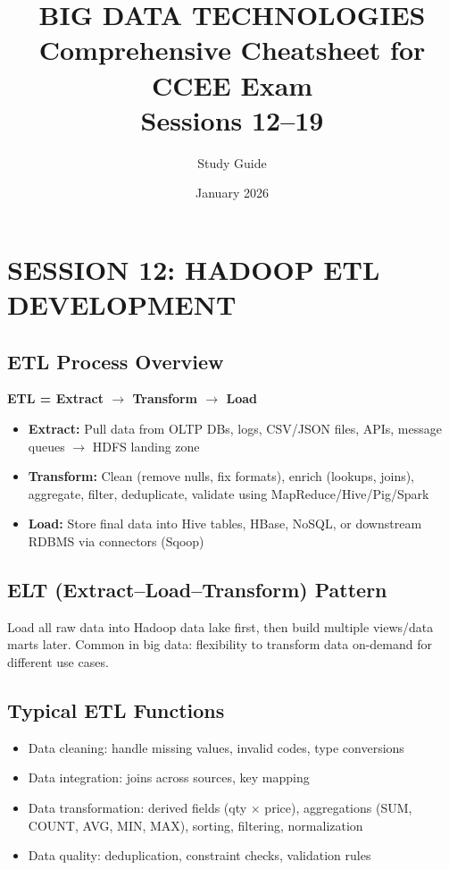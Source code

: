 \documentclass[11pt, onecolumn, a4paper]{article}
\title{\textbf{BIG DATA TECHNOLOGIES} \\ \large Comprehensive Cheatsheet for CCEE Exam \\ Sessions 12--19}
\author{Study Guide}
\date{January 2026}
\begin{document}
\maketitle
\tableofcontents
\newpage

\section{SESSION 12: HADOOP ETL DEVELOPMENT}

\subsection{ETL Process Overview}

\textbf{ETL = Extract $\rightarrow$ Transform $\rightarrow$ Load}

\begin{itemize}
  \item \textbf{Extract:} Pull data from OLTP DBs, logs, CSV/JSON files, APIs, message queues $\rightarrow$ HDFS landing zone
  \item \textbf{Transform:} Clean (remove nulls, fix formats), enrich (lookups, joins), aggregate, filter, deduplicate, validate using MapReduce/Hive/Pig/Spark
  \item \textbf{Load:} Store final data into Hive tables, HBase, NoSQL, or downstream RDBMS via connectors (Sqoop)
\end{itemize}

\subsection{ELT (Extract--Load--Transform) Pattern}

Load all raw data into Hadoop data lake first, then build multiple views/data marts later. Common in big data: flexibility to transform data on-demand for different use cases.

\subsection{Typical ETL Functions}

\begin{itemize}
  \item Data cleaning: handle missing values, invalid codes, type conversions
  \item Data integration: joins across sources, key mapping
  \item Data transformation: derived fields (qty $\times$ price), aggregations (SUM, COUNT, AVG, MIN, MAX), sorting, filtering, normalization
  \item Data quality: deduplication, constraint checks, validation rules
\end{itemize}
\end{document}

